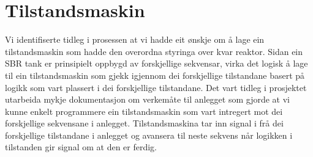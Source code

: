 \section{Tilstandsmaskin}
\thispagestyle{fancy}

Vi identifiserte tidleg i prosessen at vi hadde eit ønskje om å lage ein tilstandsmaskin som hadde den overordna styringa over kvar reaktor. 
Sidan ein SBR tank er prinsipielt oppbygd av forskjellige sekvensar, virka det logisk å lage til ein tilstandsmaskin som gjekk igjennom dei forskjellige tilstandane basert på logikk som vart plassert i dei forskjellige tilstandane. 
Det vart tidleg i prosjektet utarbeida mykje dokumentasjon om verkemåte til anlegget som gjorde at vi kunne enkelt programmere ein tilstandsmaskin som vart intregert mot dei forskjellige sekvensane i anlegget. 
Tilstandsmaskina tar inn signal i frå dei forskjellige tilstandane i anlegget og avansera til neste sekvens når logikken i tilstanden gir signal om at den er ferdig. 


